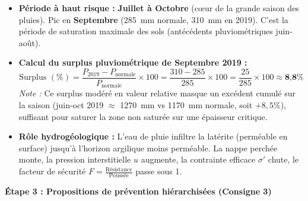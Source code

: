 \documentclass[11pt]{article}
\begin{document}
\begin{exoresolu}
\begin{itemize}
    \item \textbf{Période à haut risque :} \textbf{Juillet à Octobre} (cœur de la grande saison des pluies). Pic en \textbf{Septembre} (\SI{285}{mm} normale, \SI{310}{mm} en 2019). C'est la période de saturation maximale des sols (antécédents pluviométriques juin-août).
    \item \textbf{Calcul du surplus pluviométrique de Septembre 2019 :}
    \[
    \text{Surplus } (\%) = \frac{P_{2019} - P_{\text{normale}}}{P_{\text{normale}}} \times 100
    = \frac{310 - 285}{285} \times 100
    = \frac{25}{285} \times 100
    \approx \textbf{8,8\%}
    \]
    \textit{Note :} Ce surplus modéré en valeur relative masque un excédent cumulé sur la saison (juin-oct 2019 $\approx$ \SI{1270}{mm} vs \SI{1170}{mm} normale, soit $+8,5\%$), suffisant pour saturer la zone non saturée sur une épaisseur critique.
    \item \textbf{Rôle hydrogéologique :} L'eau de pluie infiltre la latérite (perméable en surface) jusqu'à l'horizon argilique moins perméable. La nappe perchée monte, la pression interstitielle $u$ augmente, la contrainte efficace $\sigma'$ chute, le facteur de sécurité $F = \frac{\text{Résistance}}{\text{Poussée}}$ passe sous 1.
\end{itemize}

\textbf{Étape 3 : Propositions de prévention hiérarchisées (Consigne 3)}


\end{exoresolu}
\end{document}
